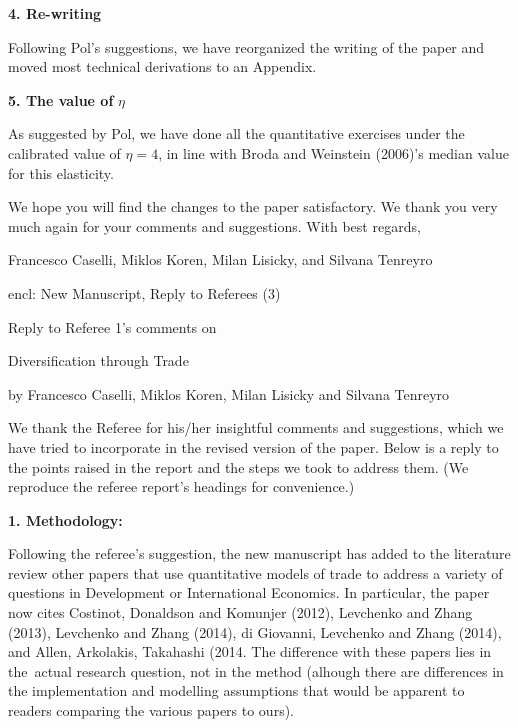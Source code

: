 \documentclass[12pt]{article}
\begin{document}
\textbf{4. Re-writing}

\bigskip Following Pol's suggestions, we have reorganized the writing of the
paper and moved most technical derivations to an Appendix.

\textbf{5. The value of }$\eta $\textbf{\ }

As suggested by Pol, we have done all the quantitative exercises under the
calibrated value of $\eta =4$, in line with Broda and Weinstein (2006)'s
median value for this elasticity.\bigskip

We hope you will find the changes to the paper satisfactory. We thank you
very much again for your comments and suggestions. With best regards,\bigskip

Francesco Caselli, Miklos Koren, Milan Lisicky, and Silvana Tenreyro

encl: New Manuscript, Reply to Referees (3)

\begin{center}
\pagebreak

\thispagestyle{plain}\setcounter{page}{1}Reply to Referee 1's comments on

{\Large Diversification through Trade}

by Francesco Caselli, Miklos Koren, Milan Lisicky and Silvana
Tenreyro\medskip

\bigskip \bigskip
\end{center}

We thank the Referee for his/her insightful comments and suggestions, which
we have tried to incorporate in the revised version of the paper. Below is a
reply to the points raised in the report and the steps we took to address
them. (We reproduce the referee report's headings for convenience.)\bigskip

\textbf{1. Methodology: }

Following the referee's suggestion, the new manuscript has added to the
literature review other papers that use quantitative models of trade to
address a variety of questions in Development or International Economics. In
particular, the paper now cites Costinot, Donaldson and Komunjer (2012),
Levchenko and Zhang (2013), Levchenko and Zhang (2014), di Giovanni,
Levchenko and Zhang (2014), and Allen,  Arkolakis, Takahashi (2014. The
difference with these papers lies in the\ actual research question, not in
the method (alhough there are differences in the implementation and
modelling assumptions that would be apparent to readers comparing the
various papers to ours).\bigskip 
\end{document}
